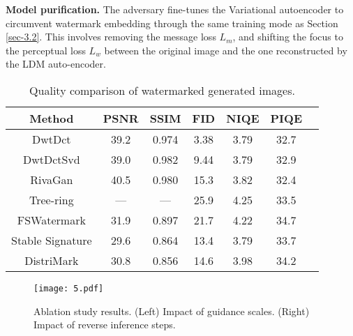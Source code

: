 \noindent\textbf{Model purification.} The adversary fine-tunes the Variational autoencoder to circumvent watermark embedding through the same training mode as Section \ref{sec-3.2}. This involves removing the message loss $L_m$, and shifting the focus to the perceptual loss $L_w$ between the original image and the one reconstructed by the LDM auto-encoder. 




\begin{table}[]
\begin{tabular}{ccccccc}
\hline
{Method} & {PSNR} & {SSIM} & {FID} & {NIQE} & {PIQE} \\\hline
DwtDct            & 39.2 & 0.974 & 3.38  & 3.79 & 32.7 \\
DwtDctSvd         & 39.0 & 0.982 & 9.44  & 3.79 & 32.9 \\
RivaGan           & 40.5 & 0.980 & 15.3  & 3.82 & 32.4 \\
Tree-ring         & ---  & ---   & 25.9  & 4.25 & 33.5 \\
FSWatermark       & 31.9 & 0.897 & 21.7 & 4.22 & 34.7 \\
Stable Signature  & 29.6 & 0.864 & 13.4  & 3.79 & 33.7 \\
DistriMark& 30.8 & 0.856 & 14.6  & 3.98 & 34.2\\
\hline

\end{tabular}
\caption{Quality comparison of watermarked generated images.}
\label{tab2:quality}
\end{table}





\begin{figure}[t]
  \centering
  \texttt{[image: 5.pdf]}
  \caption{Ablation study results. (Left) Impact of guidance scales. (Right) Impact of reverse inference steps.  
  }
  \label{Fig:guidanceScale}
\end{figure}




